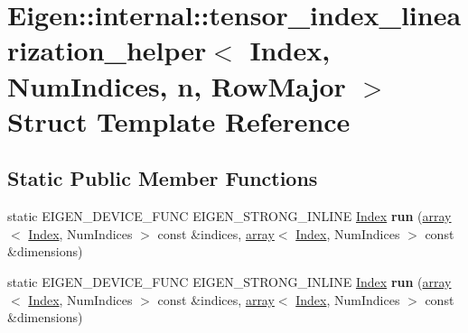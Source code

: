 \hypertarget{struct_eigen_1_1internal_1_1tensor__index__linearization__helper}{}\section{Eigen\+:\+:internal\+:\+:tensor\+\_\+index\+\_\+linearization\+\_\+helper$<$ Index, Num\+Indices, n, Row\+Major $>$ Struct Template Reference}
\label{struct_eigen_1_1internal_1_1tensor__index__linearization__helper}
\subsection*{Static Public Member Functions}
\begin{DoxyCompactItemize}
\item 
\mbox{\label{struct_eigen_1_1internal_1_1tensor__index__linearization__helper_a94d0c0365668472e406fd136648bb390}} 
static E\+I\+G\+E\+N\+\_\+\+D\+E\+V\+I\+C\+E\+\_\+\+F\+U\+NC E\+I\+G\+E\+N\+\_\+\+S\+T\+R\+O\+N\+G\+\_\+\+I\+N\+L\+I\+NE \hyperlink{namespace_eigen_a62e77e0933482dafde8fe197d9a2cfde}{Index} {\bfseries run} (\hyperlink{class_eigen_1_1array}{array}$<$ \hyperlink{namespace_eigen_a62e77e0933482dafde8fe197d9a2cfde}{Index}, Num\+Indices $>$ const \&indices, \hyperlink{class_eigen_1_1array}{array}$<$ \hyperlink{namespace_eigen_a62e77e0933482dafde8fe197d9a2cfde}{Index}, Num\+Indices $>$ const \&dimensions)
\item 
\mbox{\label{struct_eigen_1_1internal_1_1tensor__index__linearization__helper_a94d0c0365668472e406fd136648bb390}} 
static E\+I\+G\+E\+N\+\_\+\+D\+E\+V\+I\+C\+E\+\_\+\+F\+U\+NC E\+I\+G\+E\+N\+\_\+\+S\+T\+R\+O\+N\+G\+\_\+\+I\+N\+L\+I\+NE \hyperlink{namespace_eigen_a62e77e0933482dafde8fe197d9a2cfde}{Index} {\bfseries run} (\hyperlink{class_eigen_1_1array}{array}$<$ \hyperlink{namespace_eigen_a62e77e0933482dafde8fe197d9a2cfde}{Index}, Num\+Indices $>$ const \&indices, \hyperlink{class_eigen_1_1array}{array}$<$ \hyperlink{namespace_eigen_a62e77e0933482dafde8fe197d9a2cfde}{Index}, Num\+Indices $>$ const \&dimensions)
\end{DoxyCompactItemize}


